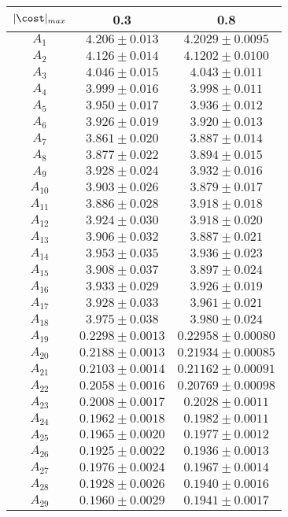 \begin{tabular}{c|c|c}
$|\cost|_{max}$ & 0.3 & 0.8\\
\hline
$A_1$ & $4.206\pm0.013$ & $4.2029\pm0.0095$ \\
$A_2$ & $4.126\pm0.014$ & $4.1202\pm0.0100$ \\
$A_3$ & $4.046\pm0.015$ & $4.043\pm0.011$ \\
$A_4$ & $3.999\pm0.016$ & $3.998\pm0.011$ \\
$A_5$ & $3.950\pm0.017$ & $3.936\pm0.012$ \\
$A_6$ & $3.926\pm0.019$ & $3.920\pm0.013$ \\
$A_7$ & $3.861\pm0.020$ & $3.887\pm0.014$ \\
$A_8$ & $3.877\pm0.022$ & $3.894\pm0.015$ \\
$A_9$ & $3.928\pm0.024$ & $3.932\pm0.016$ \\
$A_10$ & $3.903\pm0.026$ & $3.879\pm0.017$ \\
$A_11$ & $3.886\pm0.028$ & $3.918\pm0.018$ \\
$A_12$ & $3.924\pm0.030$ & $3.918\pm0.020$ \\
$A_13$ & $3.906\pm0.032$ & $3.887\pm0.021$ \\
$A_14$ & $3.953\pm0.035$ & $3.936\pm0.023$ \\
$A_15$ & $3.908\pm0.037$ & $3.897\pm0.024$ \\
$A_16$ & $3.933\pm0.029$ & $3.926\pm0.019$ \\
$A_17$ & $3.928\pm0.033$ & $3.961\pm0.021$ \\
$A_18$ & $3.975\pm0.038$ & $3.980\pm0.024$ \\
$A_19$ & $0.2298\pm0.0013$ & $0.22958\pm0.00080$ \\
$A_20$ & $0.2188\pm0.0013$ & $0.21934\pm0.00085$ \\
$A_21$ & $0.2103\pm0.0014$ & $0.21162\pm0.00091$ \\
$A_22$ & $0.2058\pm0.0016$ & $0.20769\pm0.00098$ \\
$A_23$ & $0.2008\pm0.0017$ & $0.2028\pm0.0011$ \\
$A_24$ & $0.1962\pm0.0018$ & $0.1982\pm0.0011$ \\
$A_25$ & $0.1965\pm0.0020$ & $0.1977\pm0.0012$ \\
$A_26$ & $0.1925\pm0.0022$ & $0.1936\pm0.0013$ \\
$A_27$ & $0.1976\pm0.0024$ & $0.1967\pm0.0014$ \\
$A_28$ & $0.1928\pm0.0026$ & $0.1940\pm0.0016$ \\
$A_29$ & $0.1960\pm0.0029$ & $0.1941\pm0.0017$ \\

\end{tabular}

